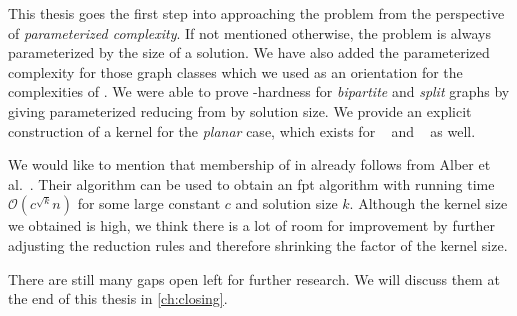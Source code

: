 This thesis goes the first step into approaching the problem from the perspective of \textit{parameterized complexity}.
If not mentioned otherwise, the problem is always parameterized by the size of a solution.
We have also added the parameterized complexity for those graph classes which we used as an orientation for the complexities of \sdom.
We were able to prove \WTWO-hardness for \textit{bipartite} and \textit{split} graphs by giving parameterized reducing from \doms by solution size. We provide an explicit construction of a kernel for the \textit{planar} case, which exists for \doms~\cite{Alber2004} and \tdoms~\cite{Garnero2019} as well.

We would like to mention that membership of \psdom in \FPT already follows from Alber et al.~\cite{Alber2002}.
Their algorithm \pdomp can be used to obtain an fpt algorithm with running time $\mathcal{O}(c^{\sqrt{k}}n)$ for some large constant $c$ and solution size $k$.
Although the kernel size we obtained is high, we think there is a lot of room for improvement by further adjusting the reduction rules and therefore shrinking the factor of the kernel size.

There are still many gaps open left for further research.
We will discuss them at the end of this thesis in \cref{ch:closing}.

